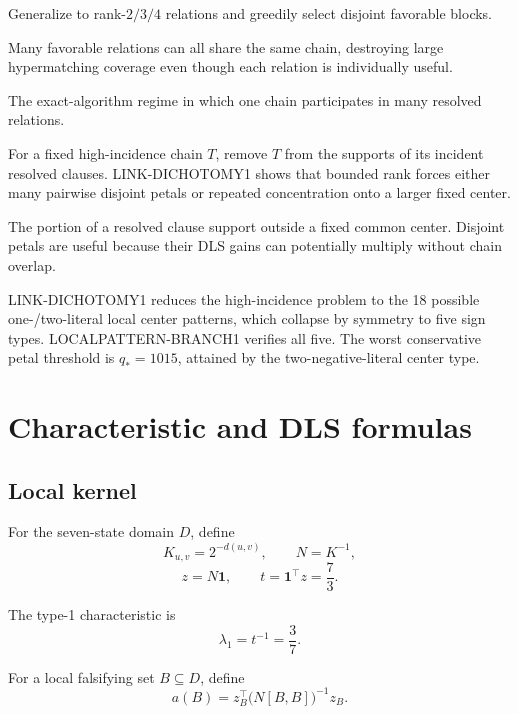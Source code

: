\documentclass[11pt]{article}
\theoremstyle{plain}
\theoremstyle{definition}
\theoremstyle{remark}
\begin{document}
\begin{description}[leftmargin=1.9em,style=nextline]
\item[RESOLVE-HYPERMATCH]
Generalize to rank-$2/3/4$ relations and greedily select disjoint favorable
blocks.

\item[Concentration obstruction]
Many favorable relations can all share the same chain, destroying large
hypermatching coverage even though each relation is individually useful.

\item[High-chain incidence]
The exact-algorithm regime in which one chain participates in many resolved
relations.

\item[Link hypergraph]
For a fixed high-incidence chain $T$, remove $T$ from the supports of its
incident resolved clauses. LINK-DICHOTOMY1 shows that bounded rank forces
either many pairwise disjoint petals or repeated concentration onto a larger
fixed center.

\item[Petal]
The portion of a resolved clause support outside a fixed common center.
Disjoint petals are useful because their DLS gains can potentially multiply
without chain overlap.

\item[Finite center-pattern audit]
LINK-DICHOTOMY1 reduces the high-incidence problem to the 18 possible
one-/two-literal local center patterns, which collapse by symmetry to five sign
types. LOCALPATTERN-BRANCH1 verifies all five. The worst conservative petal
threshold is $q_*=1015$, attained by the two-negative-literal center type.
\end{description}

\section{Characteristic and DLS formulas}

\subsection{Local kernel}

For the seven-state domain $D$, define
\[
K_{u,v}=2^{-d(u,v)},\qquad N=K^{-1},
\]
\[
z=N\mathbf1,\qquad
t=\mathbf1^\top z=\frac73.
\]

The type-1 characteristic is
\[
\lambda_1=t^{-1}=\frac37.
\]

For a local falsifying set $B\subseteq D$, define
\[
a(B)=
z_B^\top
\bigl(N[B,B]\bigr)^{-1}
z_B.
\]
\end{document}
